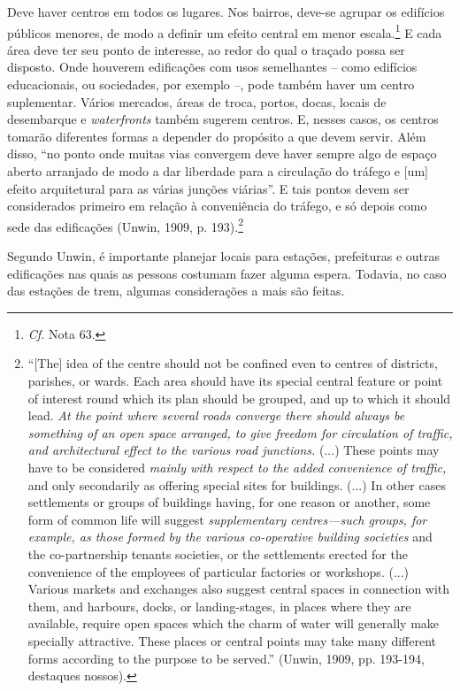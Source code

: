 \documentclass[12pt, a4paper]{book} %
\begin{document}
        Deve haver centros em todos os lugares. Nos bairros, deve-se agrupar os edifícios públicos menores, de modo a definir um efeito central em menor escala.\footnote[65]{\textit{Cf.} Nota 63.} E cada área deve ter seu ponto de interesse, ao redor do qual o traçado possa ser disposto. Onde houverem edificações com usos semelhantes – como edifícios educacionais, ou sociedades, por exemplo –, pode também haver um centro suplementar. Vários mercados, áreas de troca, portos, docas, locais de desembarque e \textit{waterfronts} também sugerem centros. E, nesses casos, os centros tomarão diferentes formas a depender do propósito a que devem servir. Além disso, ``no ponto onde muitas vias convergem deve haver sempre algo de espaço aberto arranjado de modo a dar liberdade para a circulação do tráfego e [um] efeito arquitetural para as várias junções viárias''. E tais pontos devem ser considerados primeiro em relação à conveniência do tráfego, e só depois como sede das edificações (Unwin, 1909, p. 193).\footnote[66]{``[The] idea of the centre should not be confined even to centres of districts, parishes, or wards. Each area should have its special central feature or point of interest round which its plan should be grouped, and up to which it should lead. \textit{At the point where several roads converge there should always be something of an open space arranged, to give freedom for circulation of traffic, and architectural effect to the various road junctions.} (...) These points may have to be considered \textit{mainly with respect to the added convenience of traffic,} and only secondarily as offering special sites for buildings. (...) In other cases settlements or groups of buildings having, for one reason or another, some form of common life will suggest \textit{supplementary centres—such groups, for example, as those formed by the various co-operative building societies} and the co-partnership tenants societies, or the settlements erected for the convenience of the employees of particular factories or workshops. (...) Various markets and exchanges also suggest central spaces in connection with them, and harbours, docks, or landing-stages, in places where they are available, require open spaces which the charm of water will generally make specially attractive. These places or central points may take many different forms according to the purpose to be served.''  (Unwin, 1909, pp. 193-194, destaques nossos).}

        Segundo Unwin, é importante planejar locais para estações, prefeituras e outras edificações nas quais as pessoas costumam fazer alguma espera. Todavia, no caso das estações de trem, algumas considerações a mais são feitas. 
\end{document}
